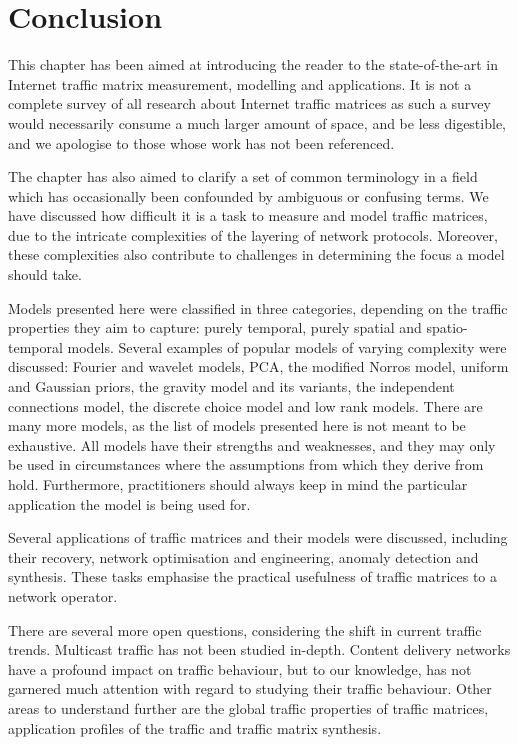 
\section{Conclusion}
\label{sec:conclusion}

This chapter has been aimed at introducing the reader to the
state-of-the-art in Internet traffic matrix measurement, modelling and
applications. It is not a complete survey of all research about
Internet traffic matrices as such a survey would necessarily
consume a much larger amount of space, and be less digestible, and we
apologise to those whose work has not been referenced. 

The chapter has also aimed to clarify a set of common terminology in a
field which has occasionally been confounded by ambiguous or confusing
terms. We have discussed how difficult it is a task to measure and model traffic matrices,
due to the intricate complexities of the layering of network protocols. Moreover, these 
complexities also contribute to challenges in determining the focus a model should take. 

Models presented here were classified in three categories, depending on the traffic properties they
aim to capture: purely temporal, purely spatial and
spatio-temporal models. Several examples of popular models 
of varying complexity were discussed: Fourier and wavelet models, PCA, the modified Norros
model, uniform and Gaussian priors, the gravity model and its variants, the independent connections model,
the discrete choice model and low rank models. There are  
many more models, as the list of models presented here is not meant to 
be exhaustive. All models have their strengths and weaknesses, and they may only be
used in circumstances where the assumptions from which they derive from hold. Furthermore,
practitioners should always keep in mind the particular application the model is being used for.

Several applications of traffic matrices and their models were discussed, 
including their recovery, network optimisation and engineering, anomaly detection 
and synthesis. These tasks emphasise the practical usefulness of traffic matrices 
to a network operator. 

There are several more open questions, considering the shift in current traffic
trends. Multicast traffic has not been studied in-depth. Content delivery networks
have a profound impact on traffic behaviour, but to our knowledge, has not garnered much
attention with regard to studying their traffic behaviour. Other areas to understand
further are the global traffic properties of traffic matrices, application profiles of the
traffic and traffic matrix synthesis. 

